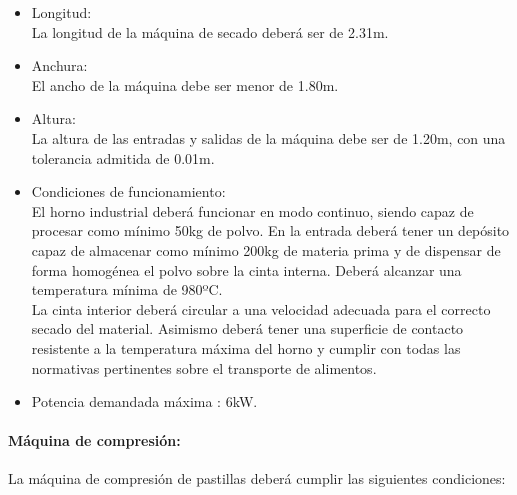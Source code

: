 		\begin{itemize}
			\item{Longitud:}\\
			La longitud de la máquina de secado deberá ser de 2.31m. 

			\item{Anchura:}\\
			El ancho de la máquina debe ser menor de 1.80m.
			
			\item{Altura:}\\
			La altura de las entradas y salidas de la máquina debe ser de 1.20m, con una tolerancia admitida de 0.01m.
			
			
			\item{Condiciones de funcionamiento: }\\
		
			El horno industrial deberá funcionar en modo continuo, siendo capaz de procesar como mínimo 50kg de polvo. En la entrada deberá tener un depósito capaz de almacenar como mínimo 200kg de materia prima y de dispensar de forma homogénea el polvo sobre la cinta interna. Deberá alcanzar una temperatura mínima de 980ºC.\\
			La cinta interior deberá circular a una velocidad adecuada para el correcto secado del material. Asimismo deberá tener una superficie de contacto resistente a la temperatura máxima del horno y cumplir con todas las normativas pertinentes sobre el transporte de alimentos.
			

			\item{Potencia demandada máxima :} 6kW.
		
		\end{itemize}

\paragraph{Máquina de compresión:}
		La máquina de compresión de pastillas deberá cumplir las siguientes condiciones:
		
